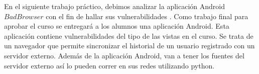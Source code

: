 \documentclass[paper=a4,fontsize=11pt]{scrartcl}	 			%
\begin{document}
En el siguiente trabajo práctico, debimos analizar la aplicación Android $BadBrowser$ con el fin de hallar sus vulnerabilidades . 
Como trabajo final para aprobar el curso se entregará a los alumnos una aplicación Android. Esta aplicación contiene vulnerabilidades del tipo de las vistas en el curso. Se trata de un navegador que permite sincronizar el historial de un usuario registrado con un servidor externo. Además de la aplicación Android, van a tener los fuentes del servidor externo así lo pueden correr en sus redes utilizando python.
\end{document}
